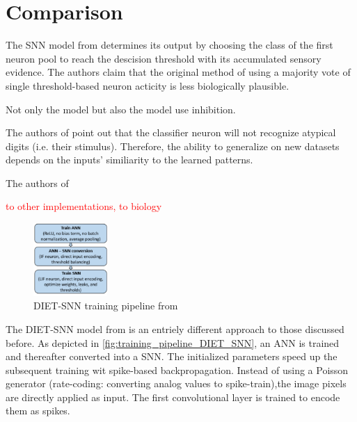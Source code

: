 \section{Comparison}
\label{sec:comparison}

The \ac{SNN} model from \cite{STDP_like} determines its output by 
choosing the class of the first neuron pool to reach the descision threshold with its accumulated sensory evidence.
The authors claim that the original method of using a majority vote of single threshold-based neuron acticity is less biologically plausible.

Not only the \cite{STDP_like} model but also the \cite{SNN} model use inhibition.

The authors of \cite{STDP_like} point out that the classifier neuron will not recognize atypical digits (i.e. their stimulus).
Therefore, the ability to generalize on new datasets depends on the inputs' similiarity to the learned patterns.

The authors of \cite{SNN} 

\textcolor{red}{to other implementations, to biology}


\begin{figure} %
    \centering
    \includegraphics[width=0.25\textwidth]{pictures/DIET_SNN_pipeline.jpg}
    \caption{\ac{DIET}-\ac{SNN} training pipeline from \cite{DIET_SNN}}
    \label{fig:training_pipeline_DIET_SNN}
\end{figure}

The \ac{DIET}-\ac{SNN} model from \cite{DIET_SNN} is an entriely different approach to those discussed before.
As depicted in \autoref{fig:training_pipeline_DIET_SNN}, an \ac{ANN} is trained and thereafter converted into a \ac{SNN}.
The initialized parameters speed up the subsequent training wit spike-based backpropagation.
Instead of using a Poisson generator (rate-coding: converting analog values to spike-train),the image pixels are directly applied as input.
The first convolutional layer is trained to encode them as spikes.

